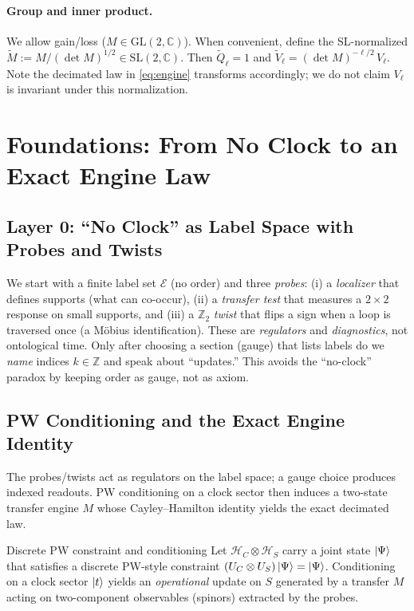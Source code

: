 \documentclass[11pt]{article}
\newcommand{\M}{M}
\begin{document}
\paragraph{Group and inner product.}
We allow gain/loss ($M\in\mathrm{GL}(2,\mathbb C)$). When convenient, define the SL-normalized
$\widetilde M:=M/(\det M)^{1/2}\in\mathrm{SL}(2,\mathbb C)$. Then
$\widetilde Q_\ell=1$ and $\widetilde V_\ell=(\det M)^{-\ell/2}\,V_\ell$.
Note the decimated law in \eqref{eq:engine} transforms accordingly; we do not claim $V_\ell$
is invariant under this normalization.

\section{Foundations: From No Clock to an Exact Engine Law}

\subsection{Layer 0: ``No Clock'' as Label Space with Probes and Twists}
We start with a finite label set $\mathcal E$ (no order) and three \emph{probes}:
(i) a \emph{localizer} that defines supports (what can co-occur),
(ii) a \emph{transfer test} that measures a $2\times2$ response on small supports, and
(iii) a $\mathbb Z_2$ \emph{twist} that flips a sign when a loop is traversed once (a Möbius identification).
These are \emph{regulators} and \emph{diagnostics}, not ontological time.
Only after choosing a section (gauge) that lists labels do we \emph{name} indices $k\in\mathbb Z$ and speak about ``updates.''
This avoids the ``no-clock'' paradox by keeping order as gauge, not as axiom.

\subsection{PW Conditioning and the Exact Engine Identity}
\noindent The probes/twists act as regulators on the label space; a gauge choice produces
indexed readouts. PW conditioning on a clock sector then induces a two-state transfer engine $M$
whose Cayley–Hamilton identity yields the exact decimated law.
\begin{mydef}{Discrete PW constraint and conditioning}
Let $\mathcal H_C\otimes\mathcal H_S$ carry a joint state $\ket{\Psi}$ that satisfies a discrete PW-style constraint $(U_C\otimes U_S)\ket{\Psi}=\ket{\Psi}$.
Conditioning on a clock sector $\ket{t}$ yields an \emph{operational} update on $S$ generated by a transfer $\M$ acting on two-component observables (spinors) extracted by the probes.
\end{mydef}
    
\end{document}

